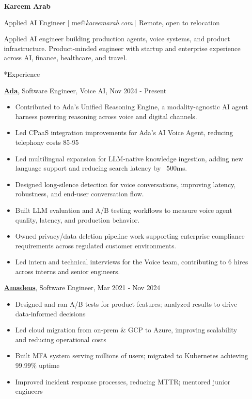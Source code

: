 \documentclass[10pt]{article}
\makeatletter
\renewcommand\section{\@startsection{section}{1}{0pt}{1.5ex}{1ex}{\normalfont\large\bfseries}}
\makeatother
\begin{document}
\begin{center}
    {\LARGE \textbf{Kareem Arab}}\par\smallskip
    Applied AI Engineer | \href{mailto:me@kareemarab.com}{me@\textit{kareemarab.com}} | Remote, open to relocation
\end{center}

\noindent
Applied AI engineer building production agents, voice systems, and product infrastructure. Product-minded engineer with startup and enterprise experience across AI, finance, healthcare, and travel.

\section*{Experience}

\noindent
\textbf{\href{https://ada.cx}{Ada}}, Software Engineer, Voice AI, Nov 2024 - Present
\begin{itemize}
    \setlength\itemsep{0em}
    \item Contributed to Ada's Unified Reasoning Engine, a modality-agnostic AI agent harness powering reasoning across voice and digital channels.
    \item Led CPaaS integration improvements for Ada's AI Voice Agent, reducing telephony costs 85-95%
    \item Led multilingual expansion for LLM-native knowledge ingestion, adding new language support and reducing search latency by ~500ms.
    \item Designed long-silence detection for voice conversations, improving latency, robustness, and end-user conversation flow.
    \item Built LLM evaluation and A/B testing workflows to measure voice agent quality, latency, and production behavior.
    \item Owned privacy/data deletion pipeline work supporting enterprise compliance requirements across regulated customer environments.
    \item Led intern and technical interviews for the Voice team, contributing to 6 hires across interns and senior engineers.
\end{itemize}

\noindent
\textbf{\href{https://amadeus.com/en}{Amadeus}}, Software Engineer, Mar 2021 - Nov 2024
\begin{itemize}
    \setlength\itemsep{0em}
    \item Designed and ran A/B tests for product features; analyzed results to drive data-informed decisions
    \item Led cloud migration from on-prem \& GCP to Azure, improving scalability and reducing operational costs
    \item Built MFA system serving millions of users; migrated to Kubernetes achieving 99.99\% uptime
    \item Improved incident response processes, reducing MTTR; mentored junior engineers
\end{itemize}
\end{document}
